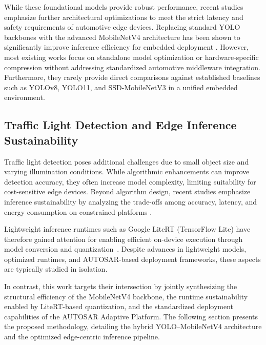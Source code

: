 While these foundational models provide robust performance, recent studies emphasize further architectural optimizations to meet the strict latency and safety requirements of automotive edge devices. Replacing standard YOLO backbones with the advanced MobileNetV4 architecture has been shown to significantly improve inference efficiency for embedded deployment \cite{lei2025emnv4}\cite{ qin_2024_mobilenetv4}\cite{chen_2025_mobilenetgdr}. However, most existing works focus on standalone model optimization or hardware-specific compression without addressing standardized automotive middleware integration. Furthermore, they rarely provide direct comparisons against established baselines such as YOLOv8, YOLO11, and SSD-MobileNetV3 in a unified embedded environment.

\subsection{Traffic Light Detection and Edge Inference Sustainability}
Traffic light detection poses additional challenges due to small object size and varying illumination conditions. While algorithmic enhancements can improve detection accuracy, they often increase model complexity, limiting suitability for cost-sensitive edge devices. Beyond algorithm design, recent studies emphasize inference sustainability by analyzing the trade-offs among accuracy, latency, and energy consumption on constrained platforms \cite{11214219}. 

Lightweight inference runtimes such as Google LiteRT (TensorFlow Lite) have therefore gained attention for enabling efficient on-device execution through model conversion and quantization~\cite{11172322}\cite{10636604}\cite{9881382}\cite{9758676}. Despite advances in lightweight models, optimized runtimes, and AUTOSAR-based deployment frameworks, these aspects are typically studied in isolation.

In contrast, this work targets their intersection by jointly synthesizing the structural efficiency of the MobileNetV4 backbone, the runtime sustainability enabled by LiteRT-based quantization, and the standardized deployment capabilities of the AUTOSAR Adaptive Platform. The following section presents the proposed methodology, detailing the hybrid YOLO--MobileNetV4 architecture and the optimized edge-centric inference pipeline.


